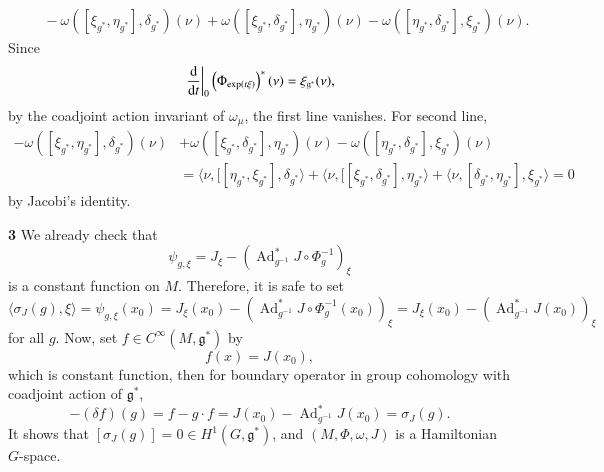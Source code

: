 \documentclass[a4paper, 12pt]{article}
\theoremstyle{Mydefinition}
\theoremstyle{Mytheorem}
\DeclareMathOperator{\Ad}{Ad}
\begin{document}
\begin{enumerate}
\begin{equation*}
\begin{split}
        &\phantom{=}-\omega\left([\xi_{g^*},\eta_{g^*}], \delta_{g^*}\right)(\nu)+\omega\left([\xi_{g^*},\delta_{g^*}], \eta_{g^*}\right)(\nu)-\omega\left([\eta_{g^*},\delta_{g^*}], \xi_{g^*}\right)(\nu).
    \end{split}
    \end{equation*}
    Since
    \begin{equation*}
        \left.\dv{t}\right|_{0}\left(\Phi_{\exp(t\xi)}\right)^*(\nu) = \xi_{\mathfrak{g}^*}(\nu),
    \end{equation*}
    by the coadjoint action invariant of $\omega_\mu$, the first line vanishes. For second line,
    \begin{equation*}
        \begin{split}
            -\omega\left([\xi_{g^*},\eta_{g^*}], \delta_{g^*}\right)(\nu)&+\omega\left([\xi_{g^*},\delta_{g^*}], \eta_{g^*}\right)(\nu)-\omega\left([\eta_{g^*},\delta_{g^*}], \xi_{g^*}\right)(\nu) \\
        &= \langle \nu, [[\eta_{g^*},\xi_{g^*}], \delta_{g^*}\rangle + \langle \nu, [[\xi_{g^*},\delta_{g^*}],\eta_{g^*}\rangle + \langle \nu, [\delta_{g^*},\eta_{g^*}], \xi_{g^*}\rangle=0
        \end{split}
    \end{equation*}
    by Jacobi's identity.\\
\end{enumerate}

\noindent \textbf{3}
We already check that
\begin{equation*}
    \psi_{g,\xi} = J_\xi - \left(\Ad_{g^{-1}}^*J\circ \Phi_g^{-1}\right)_\xi
\end{equation*}
is a constant function on $M$. Therefore, it is safe to set
\begin{equation*}
    \langle\sigma_{J}(g), \xi\rangle = \psi_{g,\xi}(x_0) = J_\xi(x_0) - \left(\Ad_{g^{-1}}^*J\circ \Phi_g^{-1}(x_0)\right)_\xi=J_\xi(x_0) - \left(\Ad_{g^{-1}}^*J(x_0)\right)_\xi
\end{equation*}
for all $g$. Now, set $f\in C^\infty(M, \mathfrak{g}^*)$ by
\begin{equation*}
    f(x) = J(x_0),
\end{equation*}
which is constant function, then for boundary operator in group cohomology with coadjoint action of $\mathfrak{g}^*$,
\begin{equation*}
    -(\delta f)(g) = f-g\cdot f = J(x_0) - \Ad_{g^{-1}}^*J(x_0) = \sigma_{J}(g).
\end{equation*}
It shows that $[\sigma_J(g)] = 0\in H^1(G,\mathfrak{g}^*)$, and $(M, \Phi, \omega, J)$ is a Hamiltonian $G$-space.\\
\end{document}
